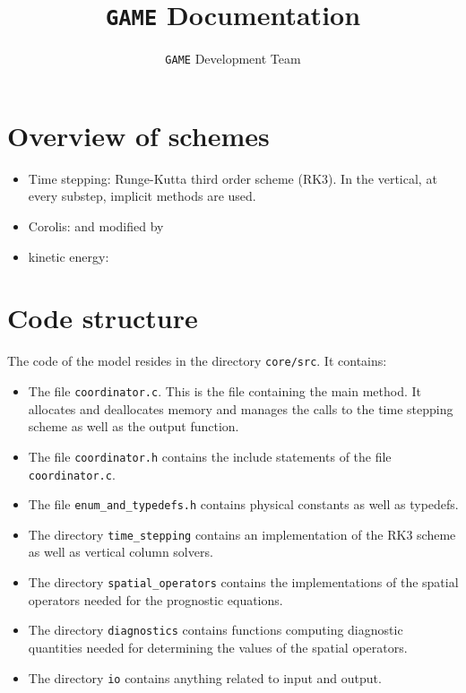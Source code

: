 \documentclass[10pt]{report}
\title{\texttt{GAME} Documentation}
\author{\texttt{GAME} Development Team}
\date{}
\begin{document}
\maketitle

\chapter{Overview of schemes}
\label{chap:overview_of_schemes}

\begin{itemize}
\item Time stepping: Runge-Kutta third order scheme (RK3). In the vertical, at every substep, implicit methods are used.
\item Corolis: \cite{thuburn_f_discrete_plane} and \cite{ringler_trsk} modified by \cite{doi:10.1002/qj.3294}
\item kinetic energy: \cite{doi:10.1002/qj.1960}
\end{itemize}

\chapter{Code structure}
\label{chap:code_structure}

The code of the model resides in the directory \texttt{core/src}. It contains:
%
\begin{itemize}
\item The file \texttt{coordinator.c}. This is the file containing the main method. It allocates and deallocates memory and manages the calls to the time stepping scheme as well as the output function.
\item The file \texttt{coordinator.h} contains the include statements of the file \texttt{coordinator.c}.
\item The file \texttt{enum\_and\_typedefs.h} contains physical constants as well as typedefs.
\item The directory \texttt{time\_stepping} contains an implementation of the RK3 scheme as well as vertical column solvers.
\item The directory \texttt{spatial\_operators} contains the implementations of the spatial operators needed for the prognostic equations.
\item The directory \texttt{diagnostics} contains functions computing diagnostic quantities needed for determining the values of the spatial operators.
\item The directory \texttt{io} contains anything related to input and output.
\end{itemize}
\end{document}
